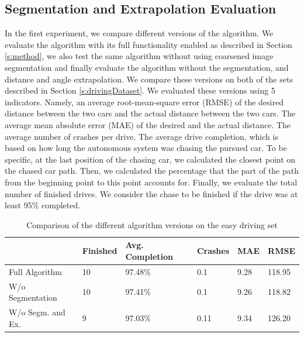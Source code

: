 \documentclass{ctuthesis/ctuthesis}
\begin{document}
\subsection{Segmentation and Extrapolation Evaluation} \label{s:experiment1}
In the first experiment, we compare different versions of the algorithm. We evaluate the algorithm with its full functionality enabled as described in Section \ref{s:method}, we also test the same algorithm without using coarsened image segmentation and finally evaluate the algorithm without the segmentation, and distance and angle extrapolation. We compare these versions on both of the sets described in Section \ref{s:drivingDataset}. We evaluated these versions using 5 indicators. Namely, an average root-mean-square error (RMSE) of the desired distance between the two cars and the actual distance between the two cars. The average mean absolute error (MAE) of the desired and the actual distance. The average number of crashes per drive. The average drive completion, which is based on how long the autonomous system was chasing the pursued car. To be specific, at the last position of the chasing car, we calculated the closest point on the chased car path. Then, we calculated the percentage that the part of the path from the beginning point to this point accounts for. Finally, we evaluate the total number of finished drives. We consider the chase to be finished if the drive was at least 95\% completed.\par


\begin{table}[]
\tabcolsep=0.11cm
\begin{tabular}{l|lllll}
\hline
                                       & Finished & Avg. Completion  & Crashes & MAE  & RMSE   \\ \hline
Full Algorithm                         & 10       & 97.48\% & 0.1     & 9.28 & 118.95 \\
W/o Segmentation                    & 10       & 97.41\%          & 0.1     & 9.26 & 118.82 \\
W/o Segm. and Ex. & 9        & 97.03\%          & 0.11    & 9.34 & 126.20 \\ \hline
\end{tabular}
\caption{Comparison of the different algorithm versions on the easy driving set}\label{t:easy_drives}
\end{table}
\end{document}
